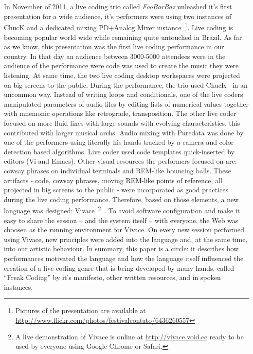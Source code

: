 \documentclass[letterpaper, 12pt]{article}
\begin{document}
\section*{} %
In November of 2011, a live coding trio called \textit{FooBarBaz}
unleashed it's first presentation for a wide
audience, it's performers were using two instances of ChucK and
a dedicated mixing PD+Analog Mixer instance~\footnote{Pictures of the presentation are available at
\url{http://www.flickr.com/photos/festivalcontato/6436260557}}. Live
coding is becoming popular world wide while remaining quite untouched in
Brazil. As far as we know, this presentation was the first live coding
performance in our country. In that day an audience between 3000-5000
attendees were in the audience of the performance
were code was used to create the music they were listening. At
same time, the two live coding desktop workspaces were projected on big screens to the public.
During the performance, the trio used ChucK~\cite{wang2003chuck} in an
uncommon way. Instead of writing loops and conditionals, one of the live coders
manipulated parameters of audio files by editing lists of numerical
values together with mnemonic operations like retrograde, transposition.
The other live coder focused on more fluid lines with large sounds with
evolving characteristics, this contributed with larger musical archs.
Audio mixing with
Puredata was done by one of the performers using literally his hands tracked by
a camera and color detection based algorithms. Live coder used code templates quick-inserted by editors (Vi and Emacs). Other visual resources the performers focused
on are: cowsay phrases on individual terminals and REM-like bouncing balls. These artifacts - code, cowsay phrases, moving REM-like points of reference, all projected in big screens to the public - were incorporated as good practices during the live coding performance.
Therefore, based on those elements, a new language was designed:
Vivace~\footnote{A live demonstration of
    Vivace is online at \url{http://vivace.void.cc} ready to be used by
everyone using Google Chrome or Safari.}~\cite{Vivace}.
To avoid software
configuration and make it easy to share the session -- and the system
itself -- with everyone, the Web was choosen as the running
environment for Vivace. On every new session performed using
Vivace, new principles were added into the language and, at the same
time, into our artistic behaviour.
In summary, this paper is a circle: it describes how performances
motivated the language and how the language itself influenced the
creation of a live coding genre that is being developed by many hands,
called ``Freak Coding'' by it's manifesto, other written resources, and
in spoken instances.
\end{document}
